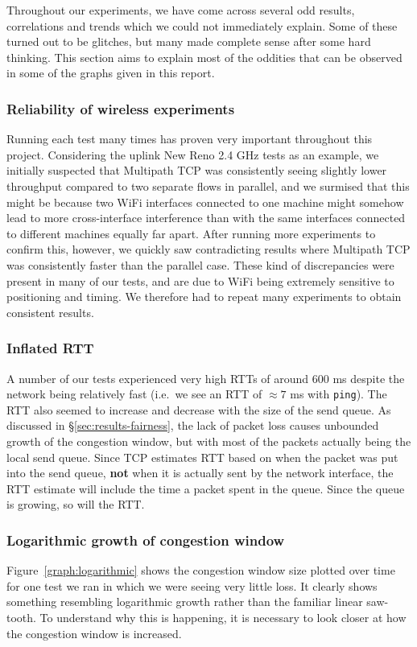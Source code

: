 Throughout our experiments, we have come across several odd results,
correlations and trends which we could not immediately explain. Some of these
turned out to be glitches, but many made complete sense after some hard
thinking. This section aims to explain most of the oddities that can be observed
in some of the graphs given in this report.

\subsubsection{Reliability of wireless experiments}
Running each test many times has proven very important throughout this project.
Considering the uplink New Reno 2.4 GHz tests as an example, we initially 
suspected that Multipath TCP was consistently seeing slightly lower 
throughput compared to two separate flows in parallel, and we surmised that
this might be because two 
WiFi interfaces connected to one machine might somehow lead to more 
cross-interface interference than with the same interfaces connected to 
different machines equally far apart. After running more experiments to confirm this, 
however, we quickly saw contradicting results where Multipath TCP was 
consistently faster than the parallel case. These kind of discrepancies were
present in many of our tests, and are due to WiFi being extremely sensitive to
positioning and timing. We therefore had to repeat many experiments to obtain
consistent results. 

\subsubsection{Inflated RTT}
A number of our tests experienced very high RTTs of around 600 ms despite the network
being relatively fast (i.e.\ we see an RTT of $\approx 7$ ms with \texttt{ping}).
The RTT also seemed to increase and decrease with the size of the send queue. As 
discussed in \S\ref{sec:results-fairness}, the lack of packet loss causes 
unbounded growth of the congestion window, but with most of the packets actually being
the local send queue. Since TCP estimates RTT based on when the packet was put into 
the send queue, \textbf{not} when it is actually sent by the network interface, 
the RTT estimate will include the time a packet spent in the queue. Since the 
queue is growing, so will the RTT.

\subsubsection{Logarithmic growth of congestion window}
Figure~\ref{graph:logarithmic} shows the congestion window size plotted over
time for one test we ran in which we were seeing very little loss. It clearly
shows something resembling logarithmic growth rather than the familiar linear
saw-tooth. To understand why this is happening, it is necessary to look closer
at how the congestion window is increased.


